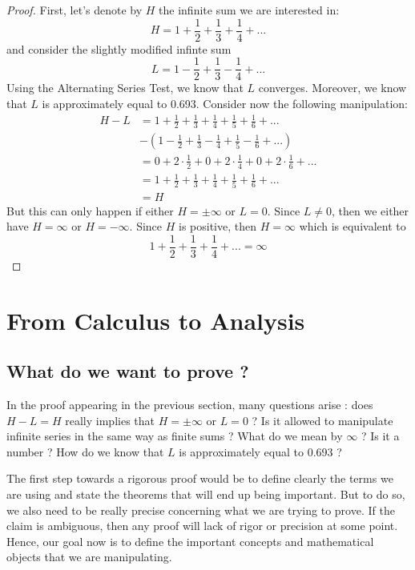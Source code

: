 \documentclass[10pt]{article}
\theoremstyle{definition}
\begin{document}
\begin{proof}
    First, let's denote by $H$ the infinite sum we are interested in:
    $$H = 1 + \frac{1}{2} + \frac{1}{3} + \frac{1}{4} + ...$$
    and consider the slightly modified infinte sum
    $$L = 1 - \frac{1}{2} + \frac{1}{3} - \frac{1}{4} + ...$$
    Using the Alternating Series Test, we know that $L$ converges. Moreover, we know that $L$ is approximately equal to 0.693. Consider now the following manipulation:
    \begin{align*}
        H - L &= 1 + \frac{1}{2} + \frac{1}{3} + \frac{1}{4} + \frac{1}{5} + \frac{1}{6} + ... \\
        & - \left(1 - \frac{1}{2} + \frac{1}{3} - \frac{1}{4} + \frac{1}{5} - \frac{1}{6} + ...\right) \\
        &= 0 + 2\cdot \frac{1}{2} + 0 + 2\cdot \frac{1}{4} + 0 + 2\cdot \frac{1}{6} + ... \\
        &= 1 + \frac{1}{2} + \frac{1}{3} + \frac{1}{4} + \frac{1}{5} + \frac{1}{6} + ... \\
        &= H
    \end{align*}
    But this can only happen if either $H = \pm \infty$ or $L = 0$. Since $L \neq 0$, then we either have $H = \infty$ or $H = -\infty$. Since $H$ is positive, then $H = \infty$ which is equivalent to
    $$ 1 + \frac{1}{2} + \frac{1}{3} + \frac{1}{4} + ... = \infty$$
\end{proof}

\section{From Calculus to Analysis}

\subsection{What do we want to prove ?}

In the proof appearing in the previous section, many questions arise : does $H - L = H$ really implies that $H = \pm \infty$ or $L = 0$ ? Is it allowed to manipulate infinite series in the same way as finite sums ? What do we mean by $\infty$ ? Is it a number ? How do we know that $L$ is approximately equal to 0.693 ? 

The first step towards a rigorous proof would be to define clearly the terms we are using and state the theorems that will end up being important. But to do so, we also need to be really precise concerning what we are trying to prove. If the claim is ambiguous, then any proof will lack of rigor or precision at some point. Hence, our goal now is to define the important concepts and mathematical objects that we are manipulating.
\end{document}

